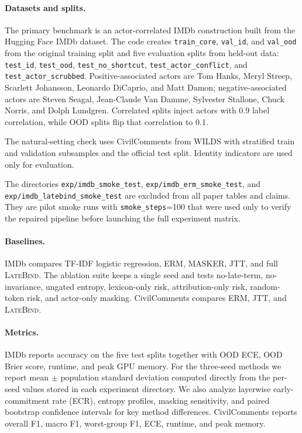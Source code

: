 \documentclass{article}
\newcommand{\LateBind}{\textsc{LateBind}}
\begin{document}
\paragraph{Datasets and splits.}
The primary benchmark is an actor-correlated IMDb construction built from the Hugging Face IMDb dataset. The code creates \texttt{train\_core}, \texttt{val\_id}, and \texttt{val\_ood} from the original training split and five evaluation splits from held-out data: \texttt{test\_id}, \texttt{test\_ood}, \texttt{test\_no\_shortcut}, \texttt{test\_actor\_conflict}, and \texttt{test\_actor\_scrubbed}. Positive-associated actors are Tom Hanks, Meryl Streep, Scarlett Johansson, Leonardo DiCaprio, and Matt Damon; negative-associated actors are Steven Seagal, Jean-Claude Van Damme, Sylvester Stallone, Chuck Norris, and Dolph Lundgren. Correlated splits inject actors with 0.9 label correlation, while OOD splits flip that correlation to 0.1.

The natural-setting check uses CivilComments from WILDS with stratified train and validation subsamples and the official test split. Identity indicators are used only for evaluation.

The directories \texttt{exp/imdb\_smoke\_test}, \texttt{exp/imdb\_erm\_smoke\_test}, and \texttt{exp/imdb\_latebind\_smoke\_test} are excluded from all paper tables and claims. They are pilot smoke runs with \texttt{smoke\_steps}=100 that were used only to verify the repaired pipeline before launching the full experiment matrix.

\paragraph{Baselines.}
IMDb compares TF-IDF logistic regression, ERM, MASKER, JTT, and full \LateBind. The ablation suite keeps a single seed and tests no-late-term, no-invariance, ungated entropy, lexicon-only risk, attribution-only risk, random-token risk, and actor-only masking. CivilComments compares ERM, JTT, and \LateBind.

\paragraph{Metrics.}
IMDb reports accuracy on the five test splits together with OOD ECE, OOD Brier score, runtime, and peak GPU memory. For the three-seed methods we report mean $\pm$ population standard deviation computed directly from the per-seed values stored in each experiment directory. We also analyze layerwise early-commitment rate (ECR), entropy profiles, masking sensitivity, and paired bootstrap confidence intervals for key method differences. CivilComments reports overall F1, macro F1, worst-group F1, ECE, runtime, and peak memory.
\end{document}
